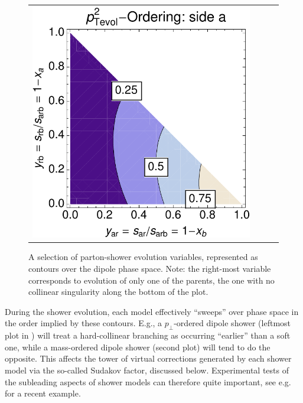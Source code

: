 \begin{figure}[t]
\begin{tabular}{cccc}
\includegraphics[scale=0.3225]{ptevola} 
\end{tabular}
\caption{A selection of parton-shower evolution variables, represented
as contours over the dipole phase space. Note: the right-most variable
corresponds to evolution of only one of the parents, the one with no
collinear singularity along the bottom of the plot. \label{fig:qe}}
\end{figure}
During the shower
evolution, each model effectively ``sweeps'' over 
phase space in the order implied
by these contours. E.g., a $p_\perp$-ordered dipole shower (leftmost
plot in ) will treat a hard-collinear branching as
occurring ``earlier'' than a soft one, while a mass-ordered dipole
shower (second plot) will tend to do the opposite. This affects
the tower of virtual corrections generated by each shower model 
via the so-called Sudakov factor, discussed below. Experimental tests
of the subleading aspects of shower models can therefore quite
important, see e.g.~\cite{Fischer:2014bja} for a recent example.

